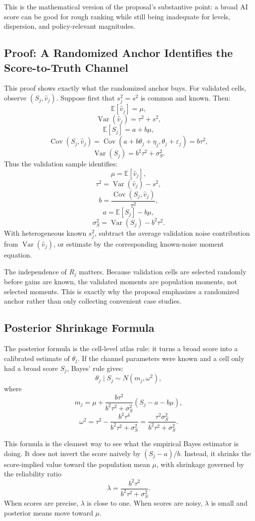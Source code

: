 \documentclass[11pt]{article}
\newcommand{\E}{\mathbb{E}}
\newcommand{\Var}{\operatorname{Var}}
\newcommand{\Cov}{\operatorname{Cov}}
\begin{document}
This is the mathematical version of the proposal's substantive point: a broad AI score can be good for rough ranking while still being inadequate for levels, dispersion, and policy-relevant magnitudes.

\subsection{Proof: A Randomized Anchor Identifies the Score-to-Truth Channel}

This proof shows exactly what the randomized anchor buys. For validated cells, observe $(S_j,\widehat v_j)$. Suppose first that $s_j^2=s^2$ is common and known. Then:
\[
  \E[\widehat v_j]=\mu,
\]
\[
  \Var(\widehat v_j)=\tau^2+s^2,
\]
\[
  \E[S_j]=a+b\mu,
\]
\[
  \Cov(S_j,\widehat v_j)=\Cov(a+b\theta_j+\eta_j,\theta_j+\varepsilon_j)=b\tau^2,
\]
\[
  \Var(S_j)=b^2\tau^2+\sigma_S^2.
\]
Thus the validation sample identifies:
\[
  \mu=\E[\widehat v_j],
\]
\[
  \tau^2=\Var(\widehat v_j)-s^2,
\]
\[
  b=\frac{\Cov(S_j,\widehat v_j)}{\tau^2},
\]
\[
  a=\E[S_j]-b\mu,
\]
\[
  \sigma_S^2=\Var(S_j)-b^2\tau^2.
\]
With heterogeneous known $s_j^2$, subtract the average validation noise contribution from $\Var(\widehat v_j)$, or estimate by the corresponding known-noise moment equation.

The independence of $R_j$ matters. Because validation cells are selected randomly before gains are known, the validated moments are population moments, not selected moments. This is exactly why the proposal emphasizes a randomized anchor rather than only collecting convenient case studies.

\subsection{Posterior Shrinkage Formula}

The posterior formula is the cell-level atlas rule: it turns a broad score into a calibrated estimate of $\theta_j$. If the channel parameters were known and a cell only had a broad score $S_j$, Bayes' rule gives:
\[
  \theta_j\mid S_j\sim N(m_j,\omega^2),
\]
where
\[
  m_j=\mu+
  \frac{b\tau^2}{b^2\tau^2+\sigma_S^2}
  \left(S_j-a-b\mu\right),
\]
\[
  \omega^2=
  \tau^2-\frac{b^2\tau^4}{b^2\tau^2+\sigma_S^2}
  =
  \frac{\tau^2\sigma_S^2}{b^2\tau^2+\sigma_S^2}.
\]

This formula is the cleanest way to see what the empirical Bayes estimator is doing. It does not invert the score naively by $(S_j-a)/b$. Instead, it shrinks the score-implied value toward the population mean $\mu$, with shrinkage governed by the reliability ratio
\[
  \lambda=\frac{b^2\tau^2}{b^2\tau^2+\sigma_S^2}.
\]
When scores are precise, $\lambda$ is close to one. When scores are noisy, $\lambda$ is small and posterior means move toward $\mu$.
\end{document}
